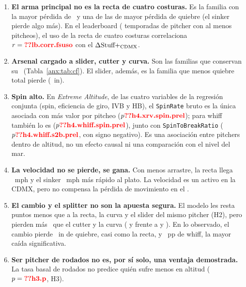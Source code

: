 \begin{enumerate}
  \item \textbf{El arma principal no es la recta de cuatro costuras.} Es la familia con la mayor pérdida de \splus\ y una de las de mayor pérdida de quiebre (el sinker pierde algo más). En el leaderboard ( temporadas de pitcher con al menos  pitcheos), el uso de la recta de cuatro costuras correlaciona $r=\cf{lb.corr.fsuso}$ con el $\Delta\text{Stuff+}_{\text{CDMX}}$.
  \item \textbf{Arsenal cargado a slider, cutter y curva.} Son las familias que conservan su \splus\ (Tabla~\ref{anx:tab:cf}). El slider, además, es la familia que menos quiebre total pierde (~in).
  \item \textbf{Spin alto.} En \emph{Extreme Altitude}, de las cuatro variables de la regresión conjunta (spin, eficiencia de giro, IVB y HB), el \texttt{SpinRate} bruto es la única asociada con más valor por pitcheo ($p\cf{h4.xrv.spin.prel}$); para whiff también lo es ($p\cf{h4.whiff.spin.prel}$), junto con \texttt{SpinToBreakRatio} ($p\cf{h4.whiff.s2b.prel}$, con signo negativo). Es una asociación entre pitchers dentro de altitud, no un efecto causal ni una comparación con el nivel del mar.
  \item \textbf{La velocidad no se pierde, se gana.} Con menos arrastre, la recta llega ~mph y el sinker ~mph más rápido al plato. La velocidad es un activo en la CDMX, pero no compensa la pérdida de movimiento en el \splus.
  \item \textbf{El cambio y el splitter no son la apuesta segura.} El modelo les resta  puntos menos que a la recta, la curva y el slider del mismo pitcher (H2), pero pierden más \splus\ que el cutter y la curva ( y  frente a  y ). En lo observado, el cambio pierde ~in de quiebre, casi como la recta, y ~pp de whiff, la mayor caída significativa.
  \item \textbf{Ser pitcher de rodados no es, por sí solo, una ventaja demostrada.} La tasa basal de rodados no predice quién sufre menos en altitud ($p=\cf{h3.p}$, H3).
\end{enumerate}

\begin{table}[H]\centering\small
\caption{Qué gana y qué pierde \splus\ en la CDMX por familia (contrafactual del modelo; media ponderada por pitcheos en toda la LMB).}\label{anx:tab:cf}
\end{table}

